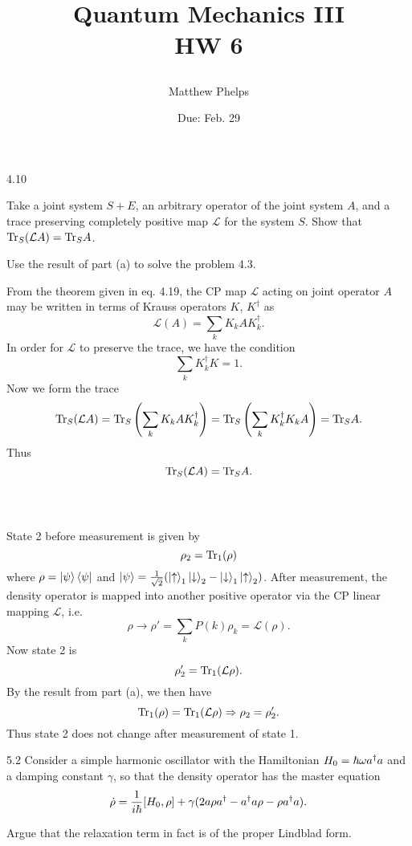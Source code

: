 \documentclass[10pt,letterpaper]{article}
\title{\begin{spacing}{1.2}Quantum Mechanics III\\HW 6\end{spacing}}
\author{Matthew Phelps}
\date{Due: Feb. 29}
\begin{document}
\maketitle

\benum
  	 \item[4.10]
	\benum
	\item
	Take a joint system $S+E$, an arbitrary operator of the joint system $A$, and a trace preserving completely
	positive map $\mathcal L$ for the system $S$. Show that $\text{Tr}_S(\mathcal LA) = \text{Tr}_S A$.
	
	\item
	Use the result of part (a) to solve the problem 4.3.
	\eenum
	\benum
	\item
	From the theorem given in eq. 4.19, the CP map $\mathcal L$ acting on joint operator $A$ may be 
	written in terms of Krauss operators $K$, $K^\dag$ as
	\[
		\mathcal L(A) = \sum_k K_k A K_k^\dag.
	\]
	In order for $\mathcal L$ to preserve the trace, we have the condition
	\[
		\sum_k K^\dag_k K = 1.
	\]
	Now we form the trace
	\[
		\text{Tr}_S(\mathcal LA) = \text{Tr}_S\left( \sum_k K_k A K_k^\dag \right) = \text{Tr}_S\left(
		\sum_k K_k^\dag K_kA\right) = \text{Tr}_SA.
	\]
	Thus
	\[
		\text{Tr}_S(\mathcal LA) = \text{Tr}_S A.
	\]
	\\ \\
	\item
	State 2 before measurement is given by
	\[
		\rho_2 = \text{Tr}_1(\rho) 
	\]
	where $\rho = \ket\psi\bra\psi$ and $\ket\psi = \frac{1}{\sqrt 2}(\ket\uparrow_1\ket\downarrow_2-\ket\downarrow_1
	\ket\uparrow_2)$. After measurement, the density operator is mapped into another positive operator via the CP linear
	mapping $\mathcal L$, i.e.
	\[
		\rho \to \rho' = \sum_k P(k)\rho_k = \mathcal L(\rho).
	\]
	Now state 2 is
	\[
		\rho_2' = \text{Tr}_1(\mathcal L\rho).
	\]
	By the result from part (a), we then have
	\[
		 \text{Tr}_1(\rho) = \text{Tr}_1(\mathcal L \rho) \Rightarrow \rho_2 =\rho_2'.
	\]
	Thus state 2 does not change after measurement of state 1. 
	\eenum 
	\item[5.2]
	Consider a simple harmonic oscillator with the Hamiltonian $H_0 = \hbar\omega a^\dag a$ and a damping constant
	$\gamma$, so that the density operator has the master equation
	\[
		\dot\rho = \frac{1}{i\hbar}[H_0,\rho]+\gamma(2a\rho a^\dag - a^\dag a\rho - \rho a^\dag a).
	\]
	\benum
	\item
	Argue that the relaxation term in fact is of the proper Lindblad form.
	
\end{document}
